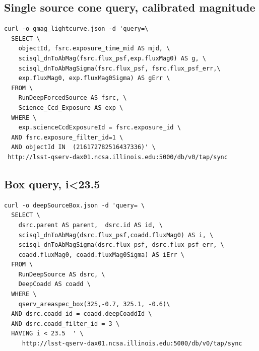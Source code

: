 \documentclass[DM,lsstdraft,toc]{lsstdoc}
\begin{document}
\subsection{Single source cone query, calibrated magnitude}
\label{sec:sql_single_mag}

\begin{lstlisting}
curl -o gmag_lightcurve.json -d 'query=\
  SELECT \
    objectId, fsrc.exposure_time_mid AS mjd, \
    scisql_dnToAbMag(fsrc.flux_psf,exp.fluxMag0) AS g, \
    scisql_dnToAbMagSigma(fsrc.flux_psf, fsrc.flux_psf_err,\
    exp.fluxMag0, exp.fluxMag0Sigma) AS gErr \
  FROM \
    RunDeepForcedSource AS fsrc, \
    Science_Ccd_Exposure AS exp \
  WHERE \
    exp.scienceCcdExposureId = fsrc.exposure_id \
  AND fsrc.exposure_filter_id=1 \
  AND objectId IN  (216172782516437336)' \
 http://lsst-qserv-dax01.ncsa.illinois.edu:5000/db/v0/tap/sync
\end{lstlisting}

\subsection{Box query, i<23.5}
\label{sec:sql_box}

\begin{lstlisting}
curl -o deepSourceBox.json -d 'query= \
  SELECT \
    dsrc.parent AS parent,  dsrc.id AS id, \
    scisql_dnToAbMag(dsrc.flux_psf,coadd.fluxMag0) AS i, \
    scisql_dnToAbMagSigma(dsrc.flux_psf, dsrc.flux_psf_err, \
    coadd.fluxMag0, coadd.fluxMag0Sigma) AS iErr \
  FROM \
    RunDeepSource AS dsrc, \
    DeepCoadd AS coadd \
  WHERE \
    qserv_areaspec_box(325,-0.7, 325.1, -0.6)\
  AND dsrc.coadd_id = coadd.deepCoaddId \
  AND dsrc.coadd_filter_id = 3 \
  HAVING i < 23.5  ' \
     http://lsst-qserv-dax01.ncsa.illinois.edu:5000/db/v0/tap/sync
\end{lstlisting}




\end{document}
